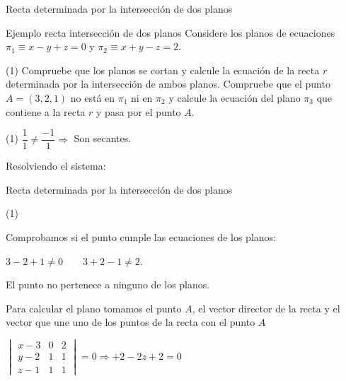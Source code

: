 \documentclass[8pt]{beamer}
\begin{document}
\begin{frame}[t]{Recta determinada por la intersección de dos planos}
\begin{exampleblock}{Ejemplo recta intersección de dos planos}
Considere los planos de ecuaciones $\pi_1 \equiv x-y+z = 0$ y $\pi_2 \equiv x+y-z = 2$.
\begin{tasks}[label=\alph*)](1)
\task Compruebe que los planos se cortan y calcule la ecuación de la recta $r$ determinada por la intersección de ambos planos.
\task Compruebe que el punto $A = (3,2,1)$ no está en $\pi_1$ ni en $\pi_2$ y calcule la
ecuación del plano $\pi_3$ que contiene a la recta $r$ y pasa por el punto $A$.
\end{tasks}
\end{exampleblock}
\begin{tasks}[label=\alph*)](1)
\task $\dfrac{1}{1} \neq \dfrac{-1}{1} \Rightarrow $ Son secantes. 

Resolviendo el sistema:
\end{tasks}
\end{frame}

\begin{frame}[t]{Recta determinada por la intersección de dos planos}
\begin{tasks}[label=\alph*),resume](1)

\task Comprobamos si el punto cumple las ecuaciones de los planos:

$3-2+1 \neq 0 \qquad 3+2-1 \neq 2 $.

El punto no pertenece a ninguno de los planos.

Para calcular el plano tomamos el punto $A$, el vector director de la recta y el vector que une uno de los puntos de la recta con el punto $A$

$\begin{vmatrix}
x-3 & 0 & 2 \\ y-2 & 1 & 1 \\ z-1 & 1 & 1 
\end{vmatrix}=0 \Rightarrow +2-2z+2=0$
\end{tasks}

\end{frame}
\end{document}
